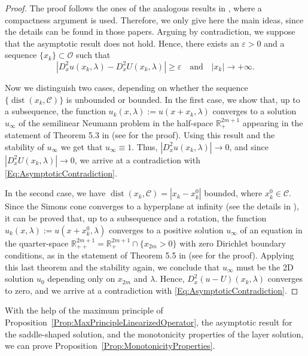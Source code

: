 \documentclass[twoside,leqno,symbols-for-thanks, draft]{rmi}
\numberwithin{equation}{section}
\theoremstyle{definition}
\newcommand{\con}[1]{\mathbb{#1}}
\newcommand{\R}{\con{R}} %
\newcommand{\ccal}{\mathscr{C}}
\newcommand{\ocal}{\mathcal{O}}
\DeclareMathOperator{\dist}{dist}
\begin{document}
\begin{proof}
	The proof follows the ones of the analogous results in \cite{Cinti-Saddle2,Cabre-Saddle,CabreTerraII}, where a compactness argument is used. Therefore, we only give here the main ideas, since the details can be found in those papers. Arguing by contradiction, we suppose that the asymptotic result does not hold. Hence, there exists an $\varepsilon>0$ and a sequence $\{x_k\}\subset \ocal$ such that 
	\begin{equation}
	\label{Eq:AsymptoticContradiction}
	|D^2_x u(x_k,\lambda)-D^2_xU(x_k,\lambda)| \geq \varepsilon \ \ \ \text{ and } \ \ \ |x_k|\to+\infty. 
	\end{equation}
	
	Now we distinguish two cases, depending on whether the sequence $\{ \dist(x_k, \ccal) \}$ is unbounded or bounded. In the first case, we show that, up to a subsequence, the function $u_k(x,\lambda) := u(x+x_k,\lambda)$ converges to a solution $u_\infty$ of the semilinear Neumann problem in the half-space $\R^{2m+1}_+$ appearing in the statement of Theorem 5.3 in \cite{Cinti-Saddle2} (see \cite{LiZhang} for the proof). Using this result and the stability of $u_\infty$ we get that $u_\infty \equiv 1$. Thus,  $|D^2_x u(x_k,\lambda)| \to 0$, and since $|D^2_x U(x_k,\lambda)| \to 0$, we arrive at a contradiction with \eqref{Eq:AsymptoticContradiction}. 
	
	In the second case, we have $\dist(x_k, \ccal) = |x_k - x_k^0|$ bounded, where $x_k^0\in \ccal$. Since the Simons cone converges to a hyperplane at infinity (see the details in \cite{CabreTerraII}), it can be proved that, up to a subsequence and a rotation, the function $u_k(x,\lambda) := u(x+x_k^0,\lambda)$ converges to a positive solution $u_\infty$ of an equation in the quarter-space $\R^{2m+1}_{++} = \R^{2m+1}_{+} \cap \{x_{2m}>0\} $ with zero Dirichlet boundary conditions, as in the statement of Theorem 5.5 in \cite{Cinti-Saddle2} (see \cite{Tan} for the proof). Applying this last theorem and the stability again, we conclude that $u_\infty$ must be the 2D solution $u_0$ depending only on $x_{2m}$ and $\lambda$. Hence, $D^2_x(u-U)(x_k,\lambda)$ converges to zero, and we arrive at a contradiction with \eqref{Eq:AsymptoticContradiction}.
\end{proof}

With the help of the maximum principle of Proposition~\ref{Prop:MaxPrincipleLinearizedOperator}, the asymptotic result for the saddle-shaped solution, and the monotonicity properties of the layer solution, we can prove Proposition~\ref{Prop:MonotonicityProperties}.
\end{document}
